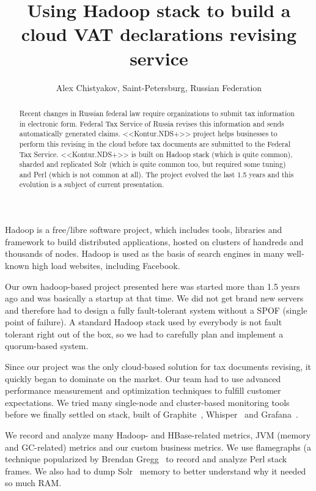 \documentclass[10pt, a5paper]{article}
\begin{document}
\title{Using Hadoop stack to build a cloud VAT declarations revising service}
\author{Alex Chistyakov, Saint-Petersburg, Russian Federation}
\maketitle
\begin{abstract}
Recent changes in Russian federal law require organizations to submit tax information in electronic form. Federal Tax Service of Russia revises this information and sends automatically \linebreak generated claims. <<Kontur.NDS+>> project helps businesses to perform this revising in the cloud before tax documents are submitted to the Federal Tax Service. <<Kontur.NDS+>> is built on Hadoop stack (which is quite common), sharded and replicated Solr (which is quite common too, but required some tuning) and Perl (which is not common at all). The project evolved the last 1.5 years and this evolution is a subject of current presentation.
\end{abstract}
Hadoop is a free/libre software project, which includes tools, libraries and framework to build distributed applications, hosted on clusters of handreds and thousands of nodes. Hadoop is used as the basis of search engines in many well-known high load websites, including Facebook.

Our own hadoop-based project presented here was started more than 1.5 years ago and was basically a startup at that time. We did not get brand new servers and therefore had to design a fully fault-tolerant system without a SPOF (single point of failure). A standard Hadoop stack used by everybody is not fault tolerant right out of the box, so we had to carefully plan and implement a quorum-based system.

Since our project was the only cloud-based solution for tax \linebreak documents  revising, it quickly began to dominate on the market. Our team had to use advanced performance measurement and optimization techniques to fulfill customer expectations. We tried many single-node and cluster-based monitoring tools before we finally settled on stack, built of Graphite~\cite{Chistyakov1}, Whisper~\cite{Chistyakov2} and Grafana~\cite{Chistyakov3}.

We record and analyze many Hadoop- and HBase-related metrics, JVM (memory and GC-related) metrics and our custom business \linebreak metrics. We use flamegraphs (a technique popularized by Brendan \linebreak Gregg~\cite{Chistyakov4} to record and analyze Perl stack frames. We also had to dump Solr~\cite{Chistyakov5} memory to better understand why it needed so much RAM.
\end{document}
